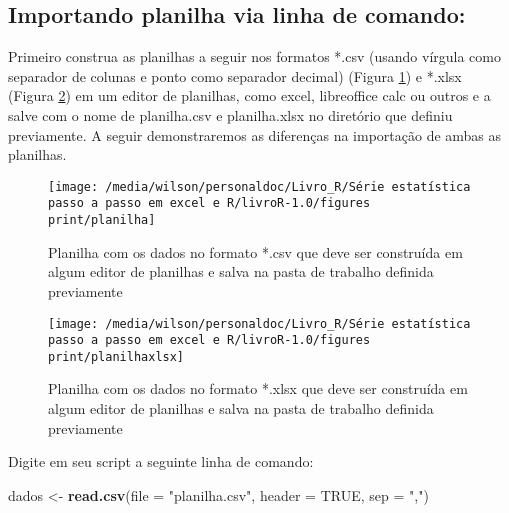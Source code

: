 \documentclass[14pt,titlepage, oneside, openany, a4paper]{book}
\newenvironment{Shaded}{\begin{snugshade}}{\end{snugshade}}
\newcommand{\DataTypeTok}[1]{\textcolor[rgb]{0.13,0.29,0.53}{#1}}
\newcommand{\KeywordTok}[1]{\textcolor[rgb]{0.13,0.29,0.53}{\textbf{#1}}}
\newcommand{\NormalTok}[1]{#1}
\newcommand{\OtherTok}[1]{\textcolor[rgb]{0.56,0.35,0.01}{#1}}
\newcommand{\StringTok}[1]{\textcolor[rgb]{0.31,0.60,0.02}{#1}}
\begin{document}
\hypertarget{importando-planilha-via-linha-de-comando}{%
\subsection{Importando planilha via linha de comando:}\label{importando-planilha-via-linha-de-comando}}

Primeiro construa as planilhas a seguir nos formatos *.csv (usando vírgula como separador de colunas e ponto como separador decimal) (Figura \ref{fig:planilha}) e *.xlsx (Figura \ref{fig:planilhaxlsx}) em um editor de planilhas, como excel, libreoffice calc ou outros e a salve com o nome de planilha.csv e planilha.xlsx no diretório que definiu previamente. A seguir demonstraremos as diferenças na importação de ambas as planilhas.

\begin{figure}[H]

{\centering \texttt{[image: /media/wilson/personaldoc/Livro\_R/Série estatística passo a passo em excel e R/livroR-1.0/figures print/planilha]} 

}

\caption{Planilha com os dados no formato *.csv que deve ser construída em algum editor de planilhas e salva na pasta de trabalho definida previamente}\label{fig:planilha}
\end{figure}

\begin{figure}[H]

{\centering \texttt{[image: /media/wilson/personaldoc/Livro\_R/Série estatística passo a passo em excel e R/livroR-1.0/figures print/planilhaxlsx]} 

}

\caption{Planilha com os dados no formato *.xlsx que deve ser construída em algum editor de planilhas e salva na pasta de trabalho definida previamente}\label{fig:planilhaxlsx}
\end{figure}

Digite em seu script a seguinte linha de comando:

\begin{Shaded}
\begin{Highlighting}[]
\NormalTok{dados <-}\StringTok{ }\KeywordTok{read.csv}\NormalTok{(}\DataTypeTok{file =} \StringTok{"planilha.csv"}\NormalTok{, }\DataTypeTok{header =} \OtherTok{TRUE}\NormalTok{, }\DataTypeTok{sep =} \StringTok{","}\NormalTok{)}
\end{Highlighting}
\end{Shaded}
\end{document}
